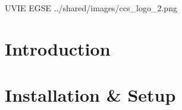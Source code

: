 %





\setmainfont{MyriadPro-SemiCondensed}
\uvietitlepage%
{UVIE EGSE}%
{\doctitle}%
{../shared/images/ccs_logo_2.png}
\setmainfont{MyriadPro}

\approvalpage

\tableofcontents
\newpage

\begin{versionhistory}


\end{versionhistory}

\chapter{Introduction}


\chapter{Installation \& Setup}

